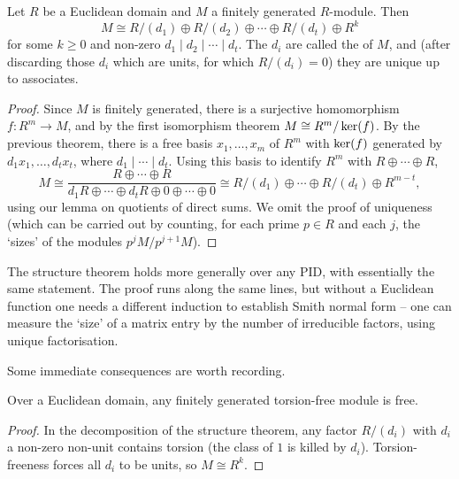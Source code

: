 \documentclass[a4paper]{scrartcl}
\begin{document}
\begin{theorem}
	Let $R$ be a Euclidean domain and $M$ a finitely generated $R$-module. Then
	$$
	M \cong R/(d_1) \oplus R/(d_2) \oplus \cdots \oplus R/(d_t) \oplus R^k
	$$
	for some $k \geq 0$ and non-zero $d_1 \mid d_2 \mid \cdots \mid d_t$. The $d_i$ are called the  of $M$, and (after discarding those $d_i$ which are units, for which $R/(d_i) = 0$) they are unique up to associates.
\end{theorem}
\begin{proof}
	Since $M$ is finitely generated, there is a surjective homomorphism $f: R^m \rightarrow M$, and by the first isomorphism theorem $M \cong R^m/\operatorname{ker}(f)$. By the previous theorem, there is a free basis $x_1, \dots, x_m$ of $R^m$ with $\operatorname{ker}(f)$ generated by $d_1 x_1, \dots, d_t x_t$, where $d_1 \mid \cdots \mid d_t$. Using this basis to identify $R^m$ with $R \oplus \cdots \oplus R$,
	$$
	M \cong \frac{R \oplus \cdots \oplus R}{d_1 R \oplus \cdots \oplus d_t R \oplus 0 \oplus \cdots \oplus 0} \cong R/(d_1) \oplus \cdots \oplus R/(d_t) \oplus R^{m - t},
	$$
	using our lemma on quotients of direct sums. We omit the proof of uniqueness (which can be carried out by counting, for each prime $p \in R$ and each $j$, the `sizes' of the modules $p^j M / p^{j+1}M$).
\end{proof}

\begin{remark}
	The structure theorem holds more generally over any PID, with essentially the same statement. The proof runs along the same lines, but without a Euclidean function one needs a different induction to establish Smith normal form -- one can measure the `size' of a matrix entry by the number of irreducible factors, using unique factorisation.
\end{remark}

Some immediate consequences are worth recording.

\begin{corollary}
	Over a Euclidean domain, any finitely generated torsion-free module is free.
\end{corollary}
\begin{proof}
	In the decomposition of the structure theorem, any factor $R/(d_i)$ with $d_i$ a non-zero non-unit contains torsion (the class of $1$ is killed by $d_i$). Torsion-freeness forces all $d_i$ to be units, so $M \cong R^k$.
\end{proof}
\end{document}
